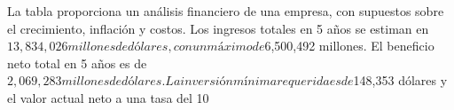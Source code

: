 La tabla proporciona un análisis financiero de una empresa, con supuestos sobre el crecimiento, inflación y costos. Los ingresos totales en 5 años se estiman en $13,834,026 millones de dólares, con un máximo de $6,500,492 millones. El beneficio neto total en 5 años es de $2,069,283 millones de dólares. La inversión mínima requerida es de $148,353 dólares y el valor actual neto a una tasa del 10%